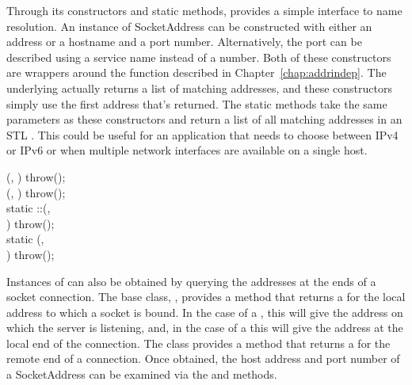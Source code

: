 Through its constructors and static  methods,
 provides a simple interface to name resolution.
An instance of SocketAddress can be constructed with either an address
or a hostname and a port number.  Alternatively, the port can be
described using a service name instead of a number.  Both of these
constructors are wrappers around the  function
described in Chapter~\ref{chap:addrindep}.  The underlying
 actually returns a list of matching
addresses, and these constructors simply use the first address that's
returned.  The static  methods take the same
parameters as these constructors and return a list of all matching
addresses in an STL .  This could be useful for an
application that needs to choose between IPv4 or IPv6 or when multiple
network interfaces are available on a single host.

\begin{inlinefcn}
(,
 )
throw();\\ 
(, )
throw();\\ 
static 
::(,\\
\hspace*{2in} ) throw();\\
static 
(,\\
\hspace*{2in} )
 throw();\\
\end{inlinefcn}

Instances of  can also be obtained by querying the
addresses at the ends of a socket connection.  The base class,
, provides a  method that
returns a  for the local address to which a socket
is bound.  In the case of a , this will give the
address on which the server is listening, and, in the case of a
 this will give the address at the local end of the
connection.  The  class provides a
 method that returns a
 for the remote end of a connection.  Once
obtained, the host address and port number of a SocketAddress can be
examined via the  and  methods.


